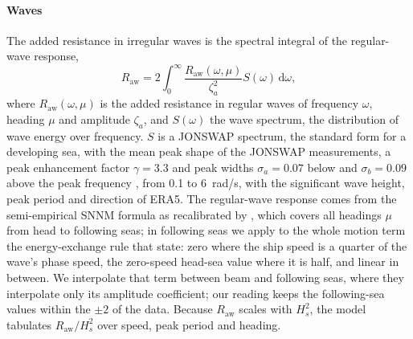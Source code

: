 \paragraph{Waves} The added resistance in irregular waves is the spectral integral of the regular-wave response,
\begin{equation}
R_\mathrm{aw} = 2 \int_0^\infty \frac{R_\mathrm{aw}(\omega,\mu)}{\zeta_a^2} S(\omega)\,\mathrm d\omega,
\end{equation}
where $R_\mathrm{aw}(\omega,\mu)$ is the added resistance in regular waves of frequency $\omega$, heading $\mu$ and amplitude $\zeta_a$, and $S(\omega)$ the wave spectrum, the distribution of wave energy over frequency. $S$ is a JONSWAP spectrum, the standard form for a developing sea, with the mean peak shape of the JONSWAP measurements, a peak enhancement factor $\gamma = 3.3$ and peak widths $\sigma_a = 0.07$ below and $\sigma_b = 0.09$ above the peak frequency \citep{hasselmann1973}, from 0.1 to \SI{6}{rad/s}, with the significant wave height, peak period and direction of ERA5. The regular-wave response comes from the semi-empirical SNNM formula as recalibrated by \citet{mittendorf2022}, which covers all headings $\mu$ from head to following seas; in following seas we apply to the whole motion term the energy-exchange rule that \citet{mittendorf2022} state: zero where the ship speed is a quarter of the wave's phase speed, the zero-speed head-sea value where it is half, and linear in between. We interpolate that term between beam and following seas, where they interpolate only its amplitude coefficient; our reading keeps the following-sea values within the $\pm2$ of the data. Because $R_\mathrm{aw}$ scales with $H_s^2$, the model tabulates $R_\mathrm{aw}/H_s^2$ over speed, peak period and heading.

